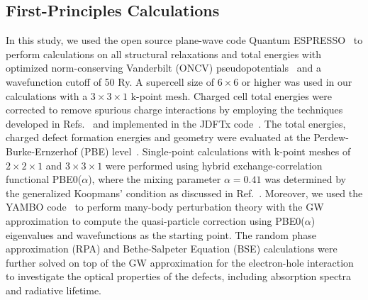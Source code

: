 \subsection{First-Principles Calculations} In this study, we used the open source plane-wave code Quantum ESPRESSO~\cite{QE1} to perform calculations on all structural relaxations and total energies with optimized norm-conserving Vanderbilt (ONCV) pseudopotentials~\cite{ONCV1} and a wavefunction cutoff of 50 Ry. A supercell size of $6\times 6$ or higher was used in our calculations with a $3\times 3\times 1$ k-point mesh. Charged cell total energies were corrected to remove spurious charge interactions by employing the techniques developed in Refs.~\cite{PING2017JCP,wu2017first,wang2020layer} and implemented in the JDFTx code~\cite{JDFTx}.
The total energies, charged defect formation energies and geometry were evaluated at the Perdew-Burke-Ernzerhof (PBE) level~\cite{perdew1996generalized}.
Single-point calculations with k-point meshes of $2\times 2\times 1$ and $3\times 3\times 1$ were performed using hybrid exchange-correlation functional PBE0($\alpha$), where the mixing parameter $\alpha=0.41$ was determined by the generalized Koopmans’ condition as discussed in Ref.~\cite{smart2018fundamental,miceli2018nonempirical}. Moreover, we used the YAMBO code~\cite{YAMBO} to perform many-body perturbation theory with the GW approximation to compute the quasi-particle correction
using PBE0($\alpha$) eigenvalues and wavefunctions as the starting point.
The random phase approximation (RPA) and Bethe-Salpeter Equation (BSE) calculations were further solved on top of the GW approximation for the electron-hole interaction to investigate the optical properties of the defects, including absorption spectra and radiative lifetime.

